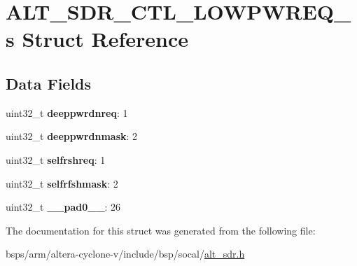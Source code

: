 \hypertarget{structALT__SDR__CTL__LOWPWREQ__s}{}\section{A\+L\+T\+\_\+\+S\+D\+R\+\_\+\+C\+T\+L\+\_\+\+L\+O\+W\+P\+W\+R\+E\+Q\+\_\+s Struct Reference}
\label{structALT__SDR__CTL__LOWPWREQ__s}
\subsection*{Data Fields}
\begin{DoxyCompactItemize}
\item 
\mbox{\label{structALT__SDR__CTL__LOWPWREQ__s_a49faf0bcff76ce86e4ba368498ca98e0}} 
uint32\+\_\+t {\bfseries deeppwrdnreq}\+: 1
\item 
\mbox{\label{structALT__SDR__CTL__LOWPWREQ__s_a1eeea5a003546188205d1fc474589b8c}} 
uint32\+\_\+t {\bfseries deeppwrdnmask}\+: 2
\item 
\mbox{\label{structALT__SDR__CTL__LOWPWREQ__s_aaf07217eeda98df622d2a5a953fcccf1}} 
uint32\+\_\+t {\bfseries selfrshreq}\+: 1
\item 
\mbox{\label{structALT__SDR__CTL__LOWPWREQ__s_a75a53aa9c348585b51c0d8a4b3ea2f6d}} 
uint32\+\_\+t {\bfseries selfrfshmask}\+: 2
\item 
\mbox{\label{structALT__SDR__CTL__LOWPWREQ__s_a56729aaa86157780018544cf1d1f8148}} 
uint32\+\_\+t {\bfseries \+\_\+\+\_\+pad0\+\_\+\+\_\+}\+: 26
\end{DoxyCompactItemize}


The documentation for this struct was generated from the following file\+:\begin{DoxyCompactItemize}
\item 
bsps/arm/altera-\/cyclone-\/v/include/bsp/socal/\mbox{\hyperlink{alt__sdr_8h}{alt\+\_\+sdr.\+h}}\end{DoxyCompactItemize}
